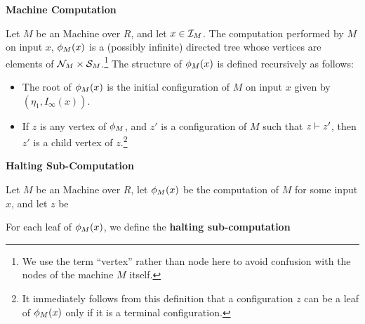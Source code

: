 \begin{definition}{\textbf{\ndet Machine Computation}}
  
  Let $M$ be an \ndet Machine over $R$, and let $x \in \mathcal{I}_M$.
  The computation performed by $M$ on input $x$, $\phi_M(x)$ is a
  (possibly infinite) directed tree whose vertices are elements of
  $\mathcal{N}_M \times \mathcal{S}_M$.\footnote{We use the term ``vertex''
    rather than node here to avoid confusion with the nodes of the
    machine $M$ itself.}  The structure of $\phi_M(x)$ is defined
  recursively as follows:
  
  \begin{itemize}
  \item The root of $\phi_M(x)$ is the initial configuration of
    $M$ on input $x$ given by $(\eta_1, I_\infty(x))$.
    
  \item If $z$ is any vertex of $\phi_M$, and $z'$ is a
    configuration of $M$ such that $z \vdash z'$, then $z'$ is a
    child vertex of $z$.\footnote{It immediately follows from this
      definition that a configuration $z$ can be a leaf of
      $\phi_M(x)$ only if it is a terminal configuration.}
  \end{itemize}
  
\end{definition}



\begin{definition}{\textbf{Halting Sub-Computation}}
  
  Let $M$ be an \ndet Machine over $R$, let $\phi_M(x)$ be the
  computation of $M$ for some input $x$, and let $z$ be 


For each leaf of $\phi_M(x)$, we define the
  \textbf{halting sub-computation}

\end{definition}

